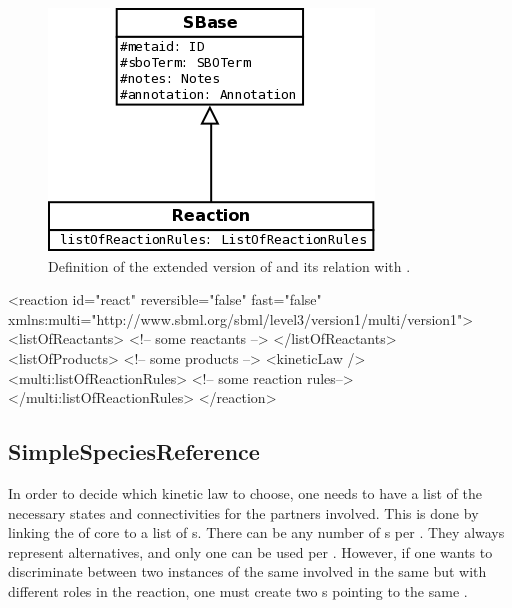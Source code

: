 \begin{figure}[H]
\begin{center}
\includegraphics[scale=0.3]{figs/pngs/ReactionClass.png} 
\caption{Definition of the extended version of  and its relation with .}
\label{fig:ReactionClass}
\end{center}
\end{figure}

\begin{example}  
<reaction id="react" reversible="false" fast="false"
          xmlns:multi="http://www.sbml.org/sbml/level3/version1/multi/version1"> 
  <listOfReactants>
    <!-- some reactants -->
  </listOfReactants>
  <listOfProducts>
    <!-- some products -->
  <kineticLaw />
  <multi:listOfReactionRules>
    <!-- some reaction rules-->
  </multi:listOfReactionRules>
</reaction>
\end{example}

\subsection{SimpleSpeciesReference}

In order to decide which kinetic law to choose, one needs to have a list of the necessary states and connectivities for the partners involved. This is done by linking the  of \sbmlLthreeVone core to a list of s. There can be any number of s per . They always represent alternatives, and only one can be used per . However, if one wants to discriminate between two instances of the same  involved in the same  but with different roles in the reaction, one must create two s pointing to the same .

